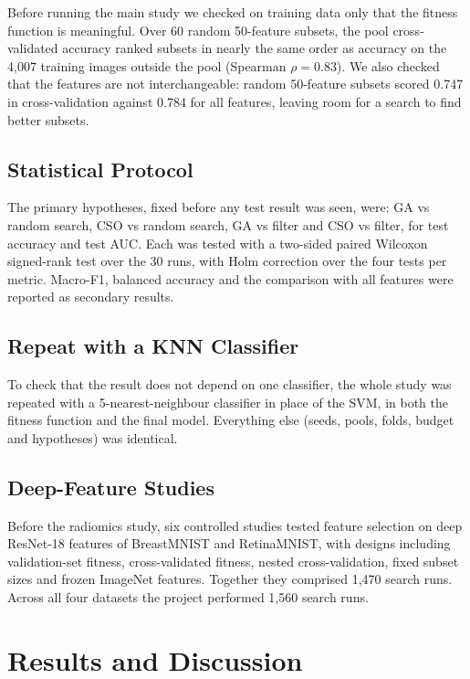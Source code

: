\documentclass[12pt,a4paper]{report}
\begin{document}
Before running the main study we checked on training data only that the fitness function is meaningful. Over 60
random 50-feature subsets, the pool cross-validated accuracy ranked subsets in nearly the same order as accuracy on
the 4,007 training images outside the pool (Spearman $\rho = 0.83$). We also checked that the features are not
interchangeable: random 50-feature subsets scored 0.747 in cross-validation against 0.784 for all features, leaving
room for a search to find better subsets.

\section{Statistical Protocol}
The primary hypotheses, fixed before any test result was seen, were: GA vs random search, CSO vs random search, GA
vs filter and CSO vs filter, for test accuracy and test AUC. Each was tested with a two-sided paired Wilcoxon
signed-rank test over the 30 runs, with Holm correction over the four tests per metric. Macro-F1, balanced accuracy
and the comparison with all features were reported as secondary results.

\section{Repeat with a KNN Classifier}
To check that the result does not depend on one classifier, the whole study was repeated with a 5-nearest-neighbour
classifier in place of the SVM, in both the fitness function and the final model. Everything else (seeds, pools,
folds, budget and hypotheses) was identical.

\section{Deep-Feature Studies}
Before the radiomics study, six controlled studies tested feature selection on deep ResNet-18 features of
BreastMNIST and RetinaMNIST, with designs including validation-set fitness, cross-validated fitness, nested
cross-validation, fixed subset sizes and frozen ImageNet features. Together they comprised 1,470 search runs. Across
all four datasets the project performed 1,560 search runs.

\chapter{Results and Discussion}
\end{document}
